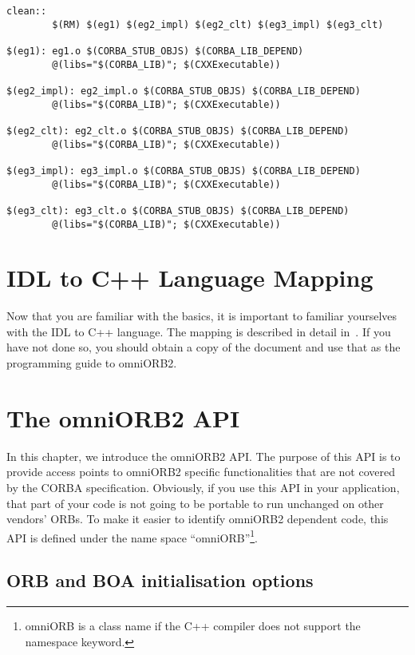 \documentclass[11pt,twoside,onecolumn]{book}
\begin{document}
{\begin{verbatim}
clean::
        $(RM) $(eg1) $(eg2_impl) $(eg2_clt) $(eg3_impl) $(eg3_clt)

$(eg1): eg1.o $(CORBA_STUB_OBJS) $(CORBA_LIB_DEPEND)
        @(libs="$(CORBA_LIB)"; $(CXXExecutable))

$(eg2_impl): eg2_impl.o $(CORBA_STUB_OBJS) $(CORBA_LIB_DEPEND)
        @(libs="$(CORBA_LIB)"; $(CXXExecutable))

$(eg2_clt): eg2_clt.o $(CORBA_STUB_OBJS) $(CORBA_LIB_DEPEND)
        @(libs="$(CORBA_LIB)"; $(CXXExecutable))

$(eg3_impl): eg3_impl.o $(CORBA_STUB_OBJS) $(CORBA_LIB_DEPEND)
        @(libs="$(CORBA_LIB)"; $(CXXExecutable))

$(eg3_clt): eg3_clt.o $(CORBA_STUB_OBJS) $(CORBA_LIB_DEPEND)
        @(libs="$(CORBA_LIB)"; $(CXXExecutable))

\end{verbatim}
}

\chapter{IDL to C++ Language Mapping}

Now that you are familiar with the basics, it is important to
familiar yourselves with the IDL to C++ language. The mapping is described
in detail in~\cite{corba2-spec}. If you have not done so, you should obtain
a copy of the document and use that as the programming guide to
omniORB2.

%

\chapter{The omniORB2 API}
\label{omniorb2api}

In this chapter, we introduce the omniORB2 API. The purpose
of this API is to provide access points to omniORB2 specific
functionalities that are not covered by the CORBA specification.
Obviously, if you use this API in your application, that part of your code
is not going to be portable to run unchanged on other vendors' ORBs. To
make it easier to identify omniORB2 dependent code, this API is defined
under the name space ``omniORB''\footnote{omniORB is a class name if the
C++ compiler does not support the namespace keyword.}.

\section{ORB and BOA initialisation options}
\label{omniorbapioptions}
\end{document}
